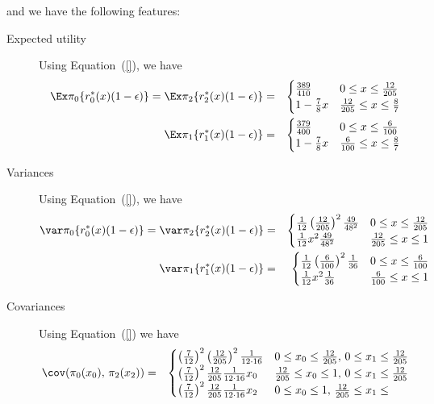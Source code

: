 and we have the following features:
\begin{description}
\item[Expected utility] Using Equation~(\ref{}), we have
\begin{eqnarray*}
\Ex\pi_0\{r_0^*(x)(1-\epsilon)\}=\Ex\pi_2\{r_2^*(x)(1-\epsilon)\}&=&\begin{cases}
\frac{389}{410}&0\leq x\leq \frac{12}{205}\\
1-\frac{7}{8}x&\frac{12}{205}\leq x\leq \frac{8}{7}\end{cases}\\
\Ex\pi_1\{r_1^*(x)(1-\epsilon)\}&=&\begin{cases}
\frac{379}{400}&0\leq x\leq \frac{6}{100}\\
1-\frac{7}{8}x&\frac{6}{100}\leq x\leq \frac{8}{7}\end{cases}\\
\end{eqnarray*}
\item[Variances] Using Equation~(\ref{}), we have
\begin{eqnarray*}
\var\pi_0\{r_0^*(x)(1-\epsilon)\}=\var\pi_2\{r_2^*(x)(1-\epsilon)\}&=&\begin{cases}
\frac{1}{12}\left(\frac{12}{205}\right)^2\frac{49}{48^2}&0\leq x\leq \frac{12}{205}\\
\frac{1}{12}x^2\frac{49}{48^2}&\frac{12}{205}\leq x\leq 1\end{cases}\\
\var\pi_1\{r_1^*(x)(1-\epsilon)\}&=&\begin{cases}
\frac{1}{12}\left(\frac{6}{100}\right)^2\frac{1}{36}&0\leq x\leq \frac{6}{100}\\
\frac{1}{12}x^2\frac{1}{36}&\frac{6}{100}\leq x\leq 1\end{cases}\\
\end{eqnarray*}
\item[Covariances] Using Equation~(\ref{}) we have
\begin{eqnarray*}
\cov(\pi_0(x_0),\,\pi_2(x_2))&=&\begin{cases}
\left(\frac{7}{12}\right)^2 \left(\frac{12}{205}\right)^2 \frac{1}{12\cdot 16}&0\leq x_0 \leq \frac{12}{205},\,0\leq x_1\leq \frac{12}{205}\\
\left(\frac{7}{12}\right)^2 \frac{12}{205} \frac{1}{12\cdot 16}x_0&\frac{12}{205}\leq x_0 \leq 1 ,\,0\leq x_1\leq \frac{12}{205}\\
\left(\frac{7}{12}\right)^2 \frac{12}{205} \frac{1}{12\cdot 16}x_2&0\leq x_0 \leq 1 ,\,\frac{12}{205}\leq x_1\leq \\

\end{cases}
\end{eqnarray*}
\end{description}
